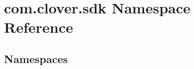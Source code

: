 \hypertarget{namespacecom_1_1clover_1_1sdk}{}\section{com.\+clover.\+sdk Namespace Reference}
\label{namespacecom_1_1clover_1_1sdk}
\subsection*{Namespaces}
\begin{DoxyCompactItemize}
\end{DoxyCompactItemize}
